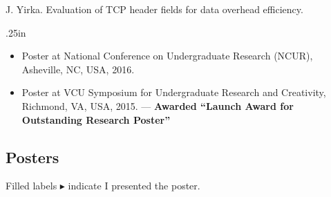\documentclass[11pt,letterpaper,serif]{moderncv}
\newcommand{\pubItemSep}{0em}
\begin{document}
J. Yirka.\quad
Evaluation of TCP header fields for data overhead efficiency.
\begin{adjustwidth}{.25in}{}
	\begin{itemize}[itemsep=\pubItemSep]
		\item[$\filledtriangleright$] Poster at National Conference on Undergraduate Research (NCUR), Asheville, NC, USA, 2016.
		\item[$\filledtriangleright$] Poster at VCU Symposium for Undergraduate Research and Creativity, Richmond, VA, USA, 2015. --- \textbf{Awarded ``Launch Award for Outstanding Research Poster''}
	\end{itemize}
\end{adjustwidth}


\smallskip
\subsection{Posters}
{\footnotesize
	Filled labels $\blacktriangleright$ indicate I presented the poster.
}
\end{document}
